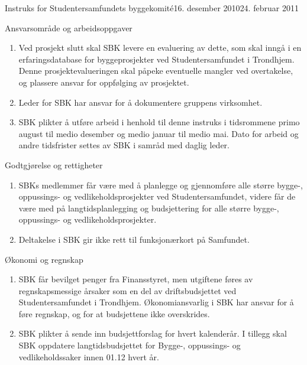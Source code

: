 \begin{instruks}{Instruks for Studentersamfundets byggekomité}{16. desember 2010}{24. februar 2011}
\begin{instruksledd}{ Ansvarsområde og arbeidsoppgaver}
\begin{enumerate}
                tilgjengelig hos daglig leder.
            \item Ved prosjekt slutt skal SBK levere en evaluering av dette, som skal inngå
                i en erfaringsdatabase for
                byggeprosjekter ved Studentersamfundet i Trondhjem. Denne
                prosjektevalueringen skal påpeke eventuelle
                mangler ved overtakelse, og plassere ansvar for oppfølging av prosjektet.
            \item
                Leder for SBK har ansvar for å dokumentere gruppens virksomhet.
            \item SBK plikter å utføre arbeid i henhold til denne instruks i tidsrommene
                primo august til medio desember og
                medio januar til medio mai. Dato for arbeid og andre tidsfrister settes av
                SBK i samråd med daglig leder.
        \end{enumerate}
    \end{instruksledd}

    \begin{instruksledd}{Godtgjørelse og rettigheter}
        \begin{enumerate}
            \item SBKs medlemmer får være med å planlegge og gjennomføre alle større bygge-,
                oppussings- og
                vedlikeholdsprosjekter ved Studentersamfundet, videre får de være med på
                langtidsplanlegging og
                budsjettering for alle større bygge-, oppussings- og vedlikeholdsprosjekter.
            \item Deltakelse i SBK gir ikke rett til funksjonærkort på Samfundet.
        \end{enumerate}
    \end{instruksledd}

    \begin{instruksledd}{Økonomi og regnskap}
        \begin{enumerate}
            \item SBK får bevilget penger fra Finansstyret, men utgiftene føres av
                regnskapsmessige årsaker som en del av
                driftsbudsjettet ved Studentersamfundet i Trondhjem. Økonomiansvarlig i SBK har
                ansvar for å føre
                regnskap, og for at budsjettene ikke overskrides.
            \item SBK plikter å sende inn budsjettforslag for hvert kalenderår. I tillegg skal
                SBK oppdatere langtidsbudsjettet
                for Bygge-, oppussings- og vedlikeholdssaker innen 01.12 hvert år.
        \end{enumerate}
    \end{instruksledd}


\end{instruks}
